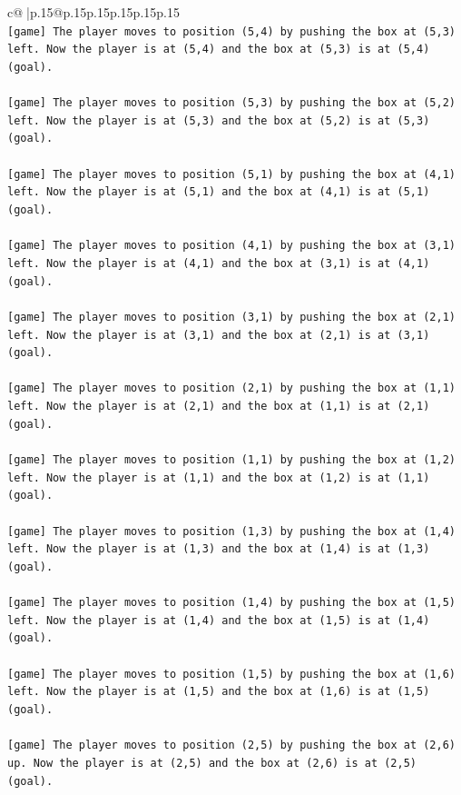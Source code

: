 \documentclass{article}
\begin{document}
{\begin{supertabular}{c@{$\;$}|p{.15\linewidth}@{}p{.15\linewidth}p{.15\linewidth}p{.15\linewidth}p{.15\linewidth}p{.15\linewidth}}
{{{\\ 
\texttt{{[}game{]} The player moves to position (5,4) by pushing the box at (5,3) left. Now the player is at (5,4) and the box at (5,3) is at (5,4) (goal).} \\
\\ 
\texttt{{[}game{]} The player moves to position (5,3) by pushing the box at (5,2) left. Now the player is at (5,3) and the box at (5,2) is at (5,3) (goal).} \\
\\ 
\texttt{{[}game{]} The player moves to position (5,1) by pushing the box at (4,1) left. Now the player is at (5,1) and the box at (4,1) is at (5,1) (goal).} \\
\\ 
\texttt{{[}game{]} The player moves to position (4,1) by pushing the box at (3,1) left. Now the player is at (4,1) and the box at (3,1) is at (4,1) (goal).} \\
\\ 
\texttt{{[}game{]} The player moves to position (3,1) by pushing the box at (2,1) left. Now the player is at (3,1) and the box at (2,1) is at (3,1) (goal).} \\
\\ 
\texttt{{[}game{]} The player moves to position (2,1) by pushing the box at (1,1) left. Now the player is at (2,1) and the box at (1,1) is at (2,1) (goal).} \\
\\ 
\texttt{{[}game{]} The player moves to position (1,1) by pushing the box at (1,2) left. Now the player is at (1,1) and the box at (1,2) is at (1,1) (goal).} \\
\\ 
\texttt{{[}game{]} The player moves to position (1,3) by pushing the box at (1,4) left. Now the player is at (1,3) and the box at (1,4) is at (1,3) (goal).} \\
\\ 
\texttt{{[}game{]} The player moves to position (1,4) by pushing the box at (1,5) left. Now the player is at (1,4) and the box at (1,5) is at (1,4) (goal).} \\
\\ 
\texttt{{[}game{]} The player moves to position (1,5) by pushing the box at (1,6) left. Now the player is at (1,5) and the box at (1,6) is at (1,5) (goal).} \\
\\ 
\texttt{{[}game{]} The player moves to position (2,5) by pushing the box at (2,6) up. Now the player is at (2,5) and the box at (2,6) is at (2,5) (goal).} \\
}}}
\end{supertabular}}
\end{document}
